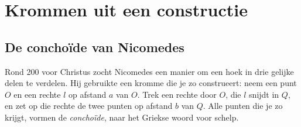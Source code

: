 
\begin{oefeningen}
\end{oefeningen}

\section{Krommen uit een constructie}

\subsection{De conchoïde van Nicomedes}

Rond 200 voor Christus zocht Nicomedes een manier om een hoek in drie gelijke delen te verdelen. Hij gebruikte een kromme die je zo construeert: neem een punt $O$ en een rechte $l$ op afstand $a$ van $O$. Trek een rechte door $O$, die $l$ snijdt in $Q$, en zet op die rechte de twee punten op afstand $b$ van $Q$. Alle punten die je zo krijgt, vormen de \textit{conchoïde}, naar het Griekse woord voor schelp.

